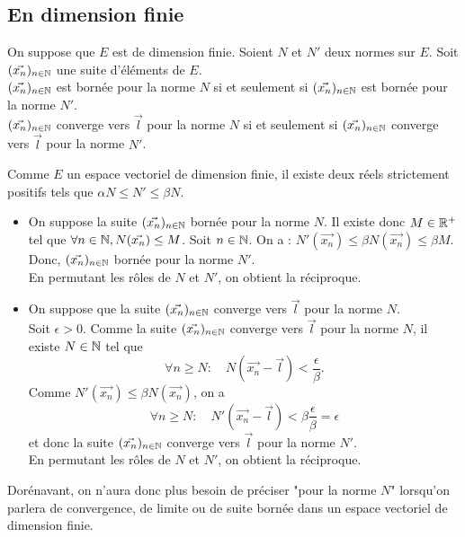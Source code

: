 \documentclass{book}
\begin{document}
\subsection{En dimension finie}
\begin{Theoreme}
On suppose que $E$ est de dimension finie. Soient $N$ et $N'$ deux normes sur $E$. Soit $(\vec{x_n})_{n\in\mathbb{N}}$ une suite d'éléments de $E$.\\
$(\vec{x_n})_{n\in\mathbb{N}}$ est bornée pour la norme $N$ si et seulement si $(\vec{x_n})_{n\in\mathbb{N}}$ est bornée pour la norme $N'$.\\
$(\vec{x_n})_{n\in\mathbb{N}}$ converge vers $\vec{l}$ pour la norme $N$ si et seulement si $(\vec{x_n})_{n\in\mathbb{N}}$ converge vers $\vec{l}$ pour la norme $N'$.
\end{Theoreme}
\begin{Demonstration}
Comme $E$ un espace vectoriel de dimension finie, il existe deux réels strictement positifs tels que $\alpha N \leq  N'  \leq \beta N$.
\begin{itemize}
\item 
On suppose la suite $(\vec{x_n})_{n\in\mathbb{N}}$
bornée pour la norme $N$. Il existe donc $M \in \mathbb{R}^{+}$ tel que $\forall n\in \mathbb{N},  N(\vec{x_n})\leq M$. Soit $n\in\mathbb{N}$. On a :
$N'(\vec{x_n})\leq  \beta N(\vec{x_n})\leq \beta M$.
Donc, $(\vec{x_n})_{n\in\mathbb{N}}$
bornée pour la norme $N'$.\\
En permutant les rôles de $N$ et $N'$, on obtient la réciproque.
\item 
On suppose que la suite $(\vec{x_n})_{n\in\mathbb{N}}$ converge vers $\vec{l}$ pour la norme $N$.\\
Soit $\epsilon>0$. Comme  la suite $(\vec{x_n})_{n\in\mathbb{N}}$ converge vers $\vec{l}$ pour la norme $N$, il existe $N\in\mathbb{N}$ tel que
$$\forall n \geq N:\quad  N(\vec{x_n} - \vec{l}) < \frac{\epsilon}{\beta}.$$
Comme $N'(\vec{x_n})\leq  \beta N(\vec{x_n})$, on a 
$$\forall n \geq N:\quad  N'(\vec{x_n} - \vec{l}) < \beta \frac{\epsilon}{\beta}=\epsilon$$
et donc la suite $(\vec{x_n})_{n\in\mathbb{N}}$ converge vers $\vec{l}$ pour la norme $N'$.\\
En permutant les rôles de $N$ et $N'$, on obtient la réciproque.
\end{itemize}
\end{Demonstration}
\begin{Remarque}
Dorénavant, on n'aura donc plus besoin de préciser "pour la norme $N$" lorsqu'on parlera de
convergence, de limite ou de suite bornée dans un espace vectoriel de dimension finie. 
\end{Remarque}
\end{document}
